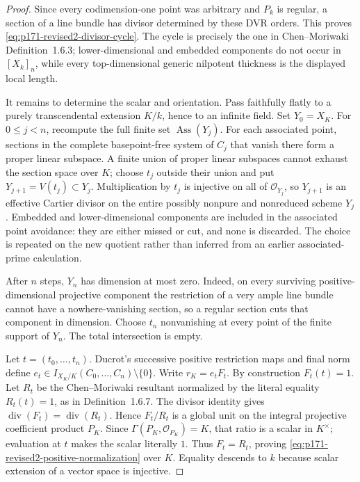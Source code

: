 \begin{proof}
Since every codimension-one point was arbitrary and \(P_k\) is regular, a
section of a line bundle has divisor determined by these DVR orders.  This
proves \eqref{eq:p171-revised2-divisor-cycle}.  The cycle is precisely the
one in Chen--Moriwaki Definition~1.6.3; lower-dimensional and embedded
components do not occur in \([X_k]_n\), while every top-dimensional generic
nilpotent thickness is the displayed local length.

It remains to determine the scalar and orientation.  Pass faithfully flatly
to a purely transcendental extension \(K/k\), hence to an infinite field.
Set \(Y_0=X_K\).  For \(0\leq j<n\), recompute the full finite set
\(\operatorname{Ass}(Y_j)\).  For each associated point, sections in the
complete basepoint-free system of \(C_j\) that vanish there form a proper
linear subspace.  A finite union of proper linear subspaces cannot exhaust
the section space over \(K\); choose \(t_j\) outside their union and put
\(Y_{j+1}=V(t_j)\subset Y_j\).  Multiplication by \(t_j\) is injective on
all of \(\mathcal O_{Y_j}\), so \(Y_{j+1}\) is an effective Cartier
divisor on the entire possibly nonpure and nonreduced scheme \(Y_j\).
Embedded and lower-dimensional components are included in the associated
point avoidance: they are either missed or cut, and none is discarded.
The choice is repeated on the new quotient rather than inferred from an
earlier associated-prime calculation.

After \(n\) steps, \(Y_n\) has dimension at most zero.  Indeed, on every
surviving positive-dimensional projective component the restriction of a
very ample line bundle cannot have a nowhere-vanishing section, so a regular
section cuts that component in dimension.  Choose \(t_n\) nonvanishing at
every point of the finite support of \(Y_n\).  The total intersection is
empty.

Let \(t=(t_0,\ldots,t_n)\).  Ducrot's successive positive restriction maps
and final norm define
\(e_t\in I_{X_K/K}(C_0,\ldots,C_n)\setminus\{0\}\).  Write
\(r_K=e_tF_t\).  By construction \(F_t(t)=1\).  Let \(R_t\) be the
Chen--Moriwaki resultant normalized by the literal equality \(R_t(t)=1\),
as in Definition~1.6.7.  The divisor identity gives
\(\operatorname{div}(F_t)=\operatorname{div}(R_t)\).  Hence
\(F_t/R_t\) is a global unit on the integral projective coefficient product
\(P_K\).  Since \(\Gamma(P_K,\mathcal O_{P_K})=K\), that ratio is a scalar
in \(K^\times\); evaluation at \(t\) makes the scalar literally \(1\).
Thus \(F_t=R_t\), proving
\eqref{eq:p171-revised2-positive-normalization} over \(K\).  Equality
descends to \(k\) because scalar extension of a vector space is injective.


\end{proof}
